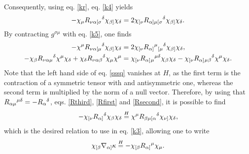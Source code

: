 \documentclass[
12pt,		%
openright,	%
twoside,  %
a4paper,			%
chapter=TITLE,		%
english,			%
french,				%
spanish,			%
brazil				%
]{USPSC-classe/USPSC}
\begin{document}
Consequently, using eq. \ref{kr}, eq. \ref{k4} yields
\begin{equation}\label{k5}
    -\chi_{\mu}R_{\nu\alpha[\sigma}\mathstrut^{\delta}\chi_{\beta]}\chi_{\delta}=2\chi_{[\nu}R_{\alpha]\mu[\sigma}\mathstrut^{\delta}\chi_{\beta]}\chi_{\delta}.
\end{equation}
By contracting $g^{\sigma\mu}$ with eq. \ref{k5}, one finds
\begin{equation}\label{sssq}
\begin{aligned}[b]
    -\chi^{\mu}R_{\nu\alpha[\mu}\mathstrut^{\delta}\chi_{\beta]}\chi_{\delta}&=2\chi_{[\nu}R_{\alpha]}\mathstrut^{\mu}\mathstrut_{[\mu}\mathstrut^{\delta}\chi_{\beta]}\chi_{\delta},\\
    -\chi_{\beta}R_{\nu\alpha\mu}\mathstrut^{\delta}\chi^{\mu}\chi_{\delta}+\chi_{\delta}R_{\nu\alpha\beta}\mathstrut^{\delta}\chi_{\mu}\chi^{\mu}&=\chi_{[\nu}R_{\alpha]}\mathstrut_{\mu}\mathstrut^{\mu\delta}\chi_{\beta}\chi_{\delta}-\chi_{[\nu}R_{\alpha]}\mathstrut_{\mu\beta}\mathstrut^{\delta}\chi^{\mu}\chi_{\delta}.
\end{aligned}   
\end{equation}Note that the left hand side of eq. \ref{sssq} vanishes at $H$, as the first term is the contraction of a symmetric tensor with and antisymmetric one, whereas the second term is multiplied by the norm of a null vector. Therefore, by using that $R_{\alpha\mu}\mathstrut^{\mu\delta}=-R_{\alpha}\mathstrut^{\delta}$, eqs. \ref{Rthird}, \ref{Rfirst} and \ref{Rsecond}, it is possible to find
\begin{equation}
    -\chi_{[\nu}R_{\alpha]}\mathstrut^{\delta}\chi_{\beta}\chi_{\delta}\overset{H}{=}\chi^{\mu}R_{\beta\mu[\alpha}\mathstrut^{\delta}\chi_{\nu]}\chi_{\delta},
\end{equation}
which is the desired relation to use in eq. \ref{k3}, allowing one to write
\begin{equation}\label{kap}
    \chi_{[\beta}\nabla_{\alpha]}\kappa\overset{H}{=}-\chi_{[\beta}R_{\alpha]}\mathstrut^{\mu}\chi_{\mu}.
\end{equation}
\end{document}
